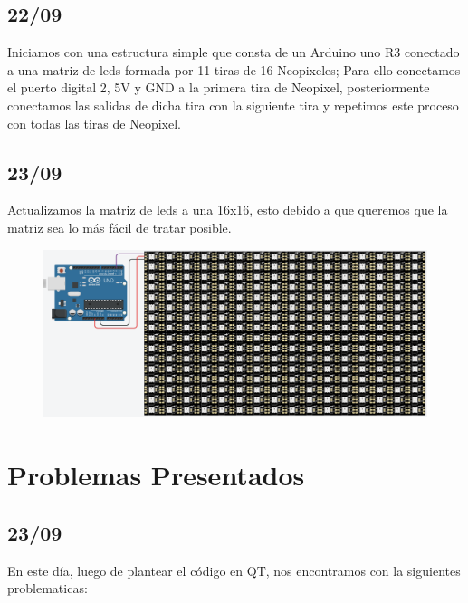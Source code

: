\documentclass{article}
\begin{document}
    \begin{flushleft}
        \subsection{22/09}
        Iniciamos con una estructura simple que consta de un Arduino uno R3 conectado a una matriz de leds formada por 11 tiras de 16 Neopixeles; Para ello conectamos el puerto digital 2, 5V y GND a la primera tira de Neopixel, posteriormente conectamos las salidas de dicha tira con la siguiente tira y repetimos este proceso con todas las tiras de Neopixel.
    \end{flushleft}
    
    \begin{flushleft}
        \subsection{23/09}
        Actualizamos la matriz de leds a una 16x16, esto debido a que queremos que la matriz sea lo más fácil de tratar posible.
    \end{flushleft}
    
    \begin{figure}[h]
    \includegraphics[width=13cm]{Images/leds.png}
    \centering
    \label{fig:leds}
    \end{figure}
    \vspace{0.5cm}
    
    
\section{Problemas Presentados}
\label{problemas}
    \begin{flushleft}
     \subsection{23/09}
     En este día, luego de plantear el código en QT, nos encontramos con la siguientes problematicas:
    \end{flushleft}
    
\end{document}
